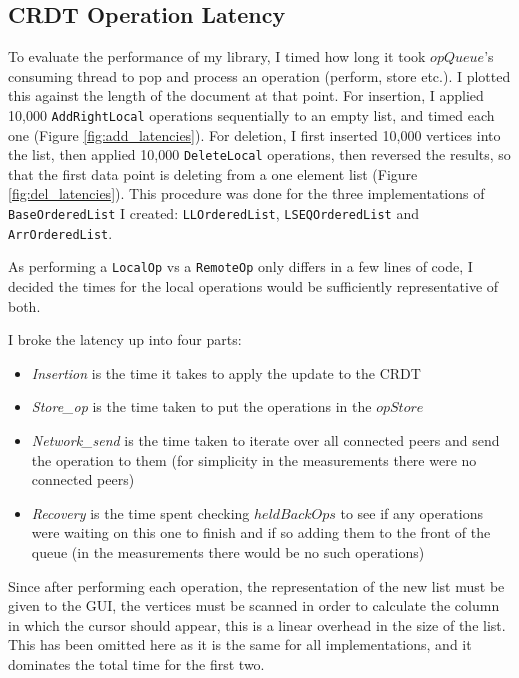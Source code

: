 \documentclass[diss.tex]{subfiles}
\begin{document}
\subsection{CRDT Operation Latency}
\label{sec:oplat}
To evaluate the performance of my library, I timed how long it took $opQueue$'s consuming thread to pop and process an operation (perform, store etc.). I plotted this against the length of the document at that point. For insertion, I applied 10,000 \texttt{AddRightLocal} operations sequentially to an empty list, and timed each one (Figure \ref{fig:add_latencies}). For deletion, I first inserted 10,000 vertices into the list, then applied 10,000 \texttt{DeleteLocal} operations, then reversed the results, so that the first data point is deleting from a one element list (Figure \ref{fig:del_latencies}). This procedure was done for the three implementations of \texttt{BaseOrderedList} I created: \texttt{LLOrderedList}, \texttt{LSEQOrderedList} and \texttt{ArrOrderedList}.

As performing a \texttt{LocalOp} vs a \texttt{RemoteOp} only differs in a few lines of code, I decided the times for the local operations would be sufficiently representative of both.

\noindent
I broke the latency up into four parts: 
\begin{itemize}
\item \textit{Insertion} is the time it takes to apply the update to the CRDT
\item \textit{Store\_op} is the time taken to put the operations in the $opStore$
\item \textit{Network\_send} is the time taken to iterate over all connected peers and send the operation to them (for simplicity in the measurements there were no connected peers)
\item \textit{Recovery} is the time spent checking $heldBackOps$ to see if any operations were waiting on this one to finish and if so adding them to the front of the queue (in the measurements there would be no such operations)
\end{itemize}

Since after performing each operation, the representation of the new list must be given to the GUI, the vertices must be scanned in order to calculate the column in which the cursor should appear, this is a linear overhead in the size of the list. This has been omitted here as it is the same for all implementations, and it dominates the total time for the first two. 
\end{document}
